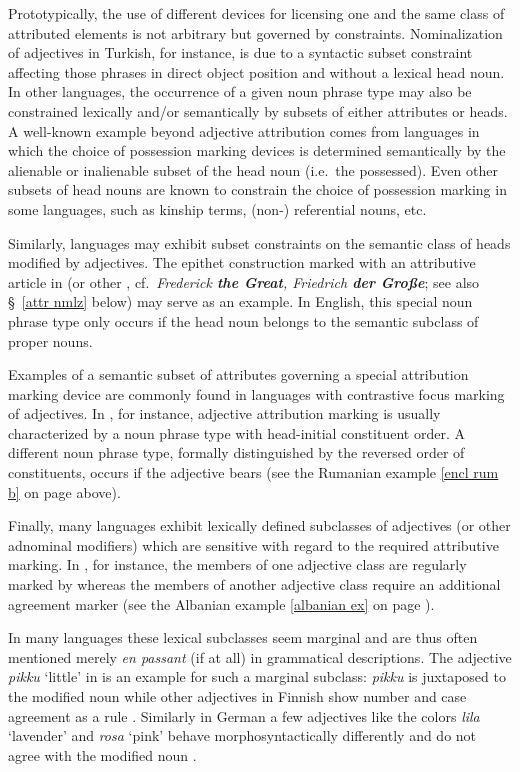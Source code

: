 Prototypically, the use of different devices for licensing one and the same class of attributed elements is not arbitrary but governed by constraints. Nominalization of adjectives in Turkish, for instance, is due to a syntactic subset constraint affecting those phrases in direct object position and without a lexical head noun. In other languages, the occurrence of a given noun phrase type may also be constrained lexically and/or semantically by subsets of either attributes or heads. A well-known example beyond adjective attribution comes from languages in which the choice of possession marking devices is determined semantically by the alienable or inalienable subset of the head noun (i.e.~the possessed). Even other subsets of head nouns are known to constrain the choice of possession marking in some languages, such as kinship terms, (non-) referential nouns, etc.

Similarly, languages may exhibit subset constraints on the semantic class of heads modified by adjectives. The epithet construction marked with an attributive article in  (or other , cf.~\textit{Frederick \textbf{the Great}, Friedrich \textbf{der Große}}; see also \S~\ref{attr nmlz} below) may serve as an example. In English, this special noun phrase type only occurs if the head noun belongs to the semantic subclass of proper nouns.

Examples of a semantic subset of attributes governing a special attribution marking device are commonly found in languages with contrastive focus marking of adjectives. In , for instance, adjective attribution marking is usually characterized by a noun phrase type with head-initial constituent order. A different noun phrase type, formally distinguished by the reversed order of constituents, occurs if the adjective bears  (see the Rumanian example \ref{encl rum b} on page \pageref{encl rum b} above).

Finally, many languages exhibit lexically defined subclasses of adjectives (or other adnominal modifiers) which are sensitive with regard to the required attributive marking. In , for instance, the members of one adjective class are regularly marked by  whereas the members of another adjective class require an additional agreement marker (see the Albanian example \ref{albanian ex} on page \pageref{albanian synchr}).

In many languages these lexical subclasses seem marginal and are thus often mentioned merely \emph{en passant} (if at all) in grammatical descriptions. The adjective \textit{pikku} ‘little’ in  is an example for such a marginal subclass: \textit{pikku} is juxtaposed to the modified noun while other adjectives in Finnish show number and case agreement as a rule \citep[75]{karlsson1999}. Similarly in German a few adjectives like the colors \textit{lila} ‘lavender’ and \textit{rosa} ‘pink’ behave morphosyntactically differently and do not agree with the modified noun \citep[cf. also][243]{schafer2015a}.  

